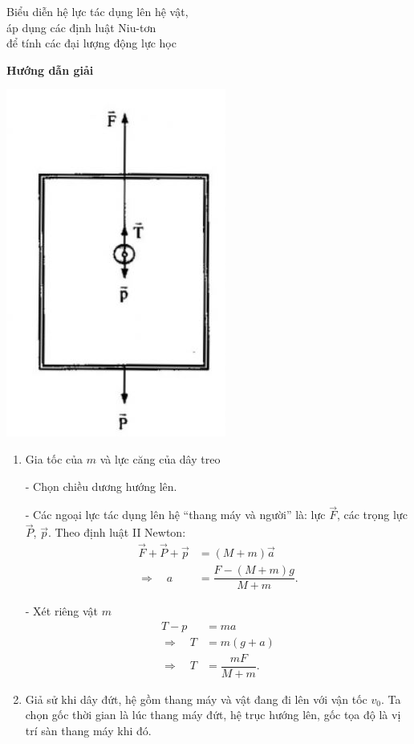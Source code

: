\begin{dang}{Biểu diễn hệ lực tác dụng lên hệ vật, \\áp dụng các định luật Niu-tơn \\để tính các đại lượng động lực học}
{	}
	{	\begin{center}
			\textbf{Hướng dẫn giải}
		\end{center}
		
		\begin{center}
			\includegraphics[scale=0.5]{../figs/VN10-PH-12-A-003-1-V2-03.jpg}
		\end{center}
		
		\begin{enumerate}[label=\alph*.]
			\item Gia tốc của $m$ và lực căng của dây treo
			
			- Chọn chiều dương hướng lên.
			
			- Các ngoại lực tác dụng lên hệ ``thang máy và người'' là: lực $\vec F$, các trọng lực $\vec P$, $\vec p$. Theo định luật II Newton:
				\begin{align*}
					\vec F + \vec P + \vec  p &= (M+m)\vec a\\
					\Rightarrow\quad a &=\dfrac{F - (M+m)g}{M+m}.
				\end{align*}

			
			- Xét riêng vật $m$
			\begin{align*}
				T - p &=ma \\
				\Rightarrow\quad T &= m(g+a) \\
				\Rightarrow\quad T &= \dfrac{mF}{M+m}.
			\end{align*}
			
			\item Giả sử khi dây đứt, hệ gồm thang máy và vật đang đi lên với vận tốc $v_0$. Ta chọn gốc thời gian là lúc thang máy đứt, hệ trục hướng lên, gốc tọa độ là vị trí sàn thang máy khi đó. 
			

\end{enumerate}}
\end{dang}
